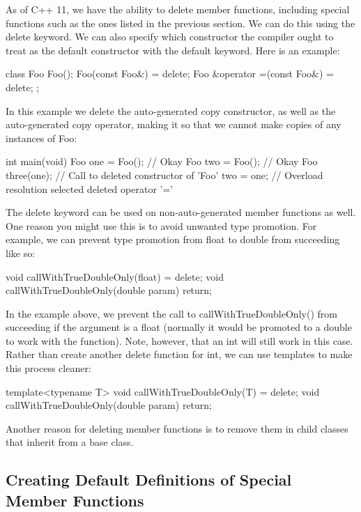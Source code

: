 \documentclass{article}
\begin{document}
As of C++ 11, we have the ability to delete member functions, including special functions such as the ones
listed in the previous section. We can do this using the delete keyword. We can also specify which
constructor the compiler ought to treat as the default constructor with the default keyword. Here is an
example:

\begin{cpplst}
class Foo
{
    Foo();
	Foo(const Foo&) = delete;
	Foo &operator =(const Foo&) = delete;
};
\end{cpplst}

In this example we delete the auto-generated copy constructor, as well as the auto-generated copy operator,
making it so that we cannot make copies of any instances of Foo:

\begin{cpplst}
int main(void)
{
    Foo one = Foo();    // Okay
    Foo two = Foo();    // Okay
    Foo three(one);     // Call to deleted constructor of 'Foo'
    two = one;          // Overload resolution selected deleted operator '='
}
\end{cpplst}

The delete keyword can be used on non-auto-generated member functions as well. One reason you might use this
is to avoid unwanted type promotion. For example, we can prevent type promotion from float to double from
succeeding like so:

\begin{cpplst}
void callWithTrueDoubleOnly(float) = delete;
void callWithTrueDoubleOnly(double param) { return; }
\end{cpplst}

In the example above, we prevent the call to callWithTrueDoubleOnly() from succeeding if the argument is a
float (normally it would be promoted to a double to work with the function). Note, however, that an int will
still work in this case. Rather than create another delete function for int, we can use templates to make
this process cleaner:

\begin{cpplst}
template<typename T>
void callWithTrueDoubleOnly(T) = delete;
void callWithTrueDoubleOnly(double param) { return; }
\end{cpplst}

Another reason for deleting member functions is to remove them in child classes that inherit from a base
class.

\subsection{Creating Default Definitions of Special Member Functions}
\end{document}
